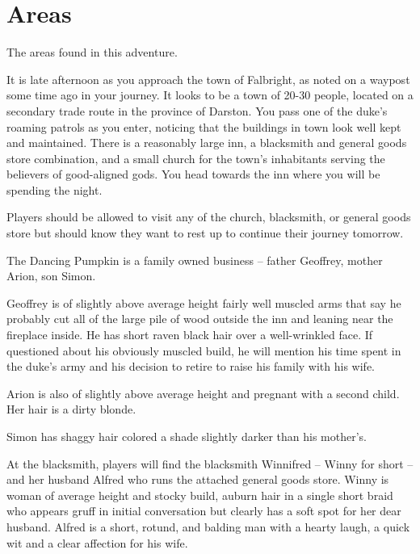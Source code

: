 \documentclass[10pt,twocolumn,openany,nodeprecatedcode,bg=none]{dndbook}
\begin{document}
\chapter{Areas}
The areas found in this adventure.

\begin{DndReadAloud}
  It is late afternoon as you approach the town of Falbright, as noted on a waypost some time ago in your journey.
  It looks to be a town of 20-30 people, located on a secondary trade route in the province of Darston.
  You pass one of the duke's roaming patrols as you enter, noticing that the buildings in town look well kept and maintained.
  There is a reasonably large inn, a blacksmith and general goods store combination, and a small church for the town's inhabitants serving the believers of good-aligned gods.
  You head towards the inn where you will be spending the night.
\end{DndReadAloud}

Players should be allowed to visit any of the church, blacksmith, or general goods store but should know they want to rest up to continue their journey tomorrow.

The Dancing Pumpkin is a family owned business -- father Geoffrey, mother Arion, son Simon.

Geoffrey is of slightly above average height fairly well muscled arms that say he probably cut all of the large pile of wood outside the inn and leaning near the fireplace inside.
He has short raven black hair over a well-wrinkled face.
If questioned about his obviously muscled build, he will mention his time spent in the duke's army and his decision to retire to raise his family with his wife.

Arion is also of slightly above average height and pregnant with a second child.
Her hair is a dirty blonde.

Simon has shaggy hair colored a shade slightly darker than his mother's.

At the blacksmith, players will find the blacksmith Winnifred -- Winny for short -- and her husband Alfred who runs the attached general goods store.
Winny is woman of average height and stocky build, auburn hair in a single short braid who appears gruff in initial conversation but clearly has a soft spot for her dear husband.
Alfred is a short, rotund, and balding man with a hearty laugh, a quick wit and a clear affection for his wife.
\end{document}
